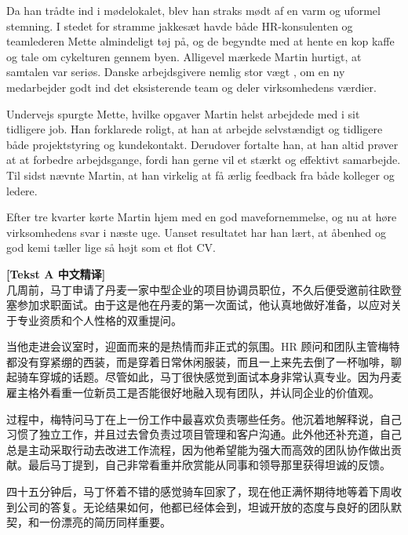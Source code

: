 Da han trådte ind i mødelokalet, blev han straks mødt af en varm og uformel stemning. I stedet for stramme jakkesæt havde både HR-konsulenten og teamlederen Mette almindeligt tøj på, og de begyndte med at hente en kop kaffe og tale om cykelturen gennem byen. Alligevel mærkede Martin hurtigt, at samtalen var seriøs. Danske arbejdsgivere  nemlig stor vægt , om en ny medarbejder  godt ind  det eksisterende team og deler virksomhedens værdier.

Undervejs spurgte Mette, hvilke opgaver Martin helst arbejdede med i sit tidligere job. Han forklarede roligt, at han   at arbejde selvstændigt og tidligere   både projektstyring og kundekontakt. Derudover fortalte han, at han altid prøver at   at forbedre arbejdsgange, fordi han gerne vil   et stærkt og effektivt samarbejde. Til sidst nævnte Martin, at han virkelig   at få ærlig feedback fra både kolleger og ledere.

Efter tre kvarter kørte Martin hjem med en god mavefornemmelse, og nu   at høre virksomhedens svar i næste uge. Uanset resultatet har han lært, at åbenhed og god kemi tæller lige så højt som et flot CV.

\begin{transbox}
\small
\textbf{\color{NCDTeal}[Tekst A 中文精译]}\\
几周前，马丁申请了丹麦一家中型企业的项目协调员职位，不久后便受邀前往欧登塞参加求职面试。由于这是他在丹麦的第一次面试，他认真地做好准备，以应对关于专业资质和个人性格的双重提问。

当他走进会议室时，迎面而来的是热情而非正式的氛围。HR 顾问和团队主管梅特都没有穿紧绷的西装，而是穿着日常休闲服装，而且一上来先去倒了一杯咖啡，聊起骑车穿城的话题。尽管如此，马丁很快感觉到面试本身非常认真专业。因为丹麦雇主格外看重一位新员工是否能很好地融入现有团队，并认同企业的价值观。

过程中，梅特问马丁在上一份工作中最喜欢负责哪些任务。他沉着地解释说，自己习惯了独立工作，并且过去曾负责过项目管理和客户沟通。此外他还补充道，自己总是主动采取行动去改进工作流程，因为他希望能为强大而高效的团队协作做出贡献。最后马丁提到，自己非常看重并欣赏能从同事和领导那里获得坦诚的反馈。

四十五分钟后，马丁怀着不错的感觉骑车回家了，现在他正满怀期待地等着下周收到公司的答复。无论结果如何，他都已经体会到，坦诚开放的态度与良好的团队默契，和一份漂亮的简历同样重要。
\end{transbox}

